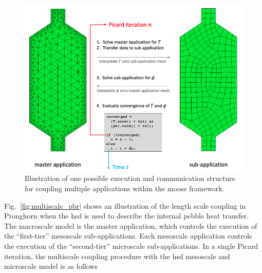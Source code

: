 \begin{figure}[!h]
\centering
\includegraphics[width=0.9\linewidth]{figs/multiapp.png}
\caption{Illustration of one possible execution and communication structure for coupling multiple applications within the \gls{moose} framework.}
\label{fig:multiapp}
\end{figure}

Fig.\ \ref{fig:multiscale_pbr} shows an illustration of the length scale coupling in Pronghorn when the \gls{hsd} is used to describe the internal pebble heat transfer. The macroscale model is the master application, which controls the execution of the ``first-tier'' mesoscale sub-applications. Each mesoscale application controls the execution of the ``second-tier'' microscale sub-applications. In a single Picard iteration, the multiscale coupling procedure with the \gls{hsd} mesoscale and microscale model is as follows\mdash

